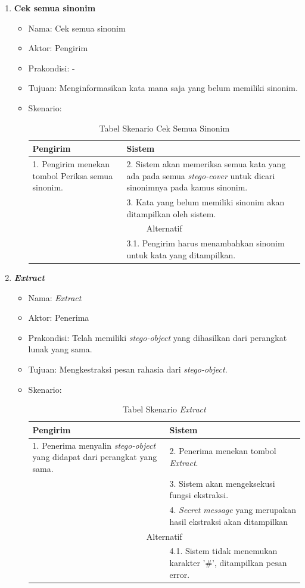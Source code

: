 \begin{enumerate}
	\item \textbf{Cek semua sinonim}
	\begin{itemize}
		\item Nama: Cek semua sinonim
		\item Aktor: Pengirim
		\item Prakondisi: -
		\item Tujuan: Menginformasikan kata mana saja yang belum memiliki sinonim.
		\item Skenario:
		\begin{table}[H]
		\centering
		\caption{Tabel Skenario Cek Semua Sinonim}
		\begin{tabular}{| p{6.5cm} | p{6.5cm} |}\hline
		Pengirim & Sistem \\
		\hline
				1. Pengirim menekan tombol Periksa semua sinonim. & 2. Sistem akan memeriksa semua kata yang ada pada semua \textit{stego-cover} untuk dicari sinonimnya pada kamus sinonim. \\
				\hline
				& 3. Kata yang belum memiliki sinonim akan ditampilkan oleh sistem. \\
				\hline
				\hline
				\multicolumn{2}{|c|}{Alternatif}\\
				\hline
				& 3.1. Pengirim harus menambahkan sinonim untuk kata yang ditampilkan.\\
		\hline
		\end{tabular}
		\end{table}
	\end{itemize}
	
	\item \textbf{\textit{Extract}}
	\begin{itemize}
		\item Nama: \textit{Extract}
		\item Aktor: Penerima
		\item Prakondisi: Telah memiliki \textit{stego-object} yang dihasilkan dari perangkat lunak yang sama.
		\item Tujuan: Mengkestraksi pesan rahasia dari \textit{stego-object}.
		\item Skenario:
		\begin{table}[H]
		\centering
		\caption{Tabel Skenario \textit{Extract}}
		\begin{tabular}{| p{6.5cm} | p{6.5cm} |}\hline
		Pengirim & Sistem \\
		\hline
				1. Penerima menyalin \textit{stego-object} yang didapat dari perangkat yang sama. & 2. Penerima menekan tombol \textit{Extract}. \\
				\hline
				& 3. Sistem akan mengeksekusi fungsi ekstraksi. \\
				\hline
				& 4. \textit{Secret message} yang merupakan hasil ekstraksi akan ditampilkan\\
				\hline
				\hline
				\multicolumn{2}{|c|}{Alternatif}\\
				\hline
				& 4.1. Sistem tidak menemukan karakter '\#', ditampilkan pesan error. \\
				\hline
		\end{tabular}
		\end{table}
	\end{itemize}
	

\end{enumerate}
